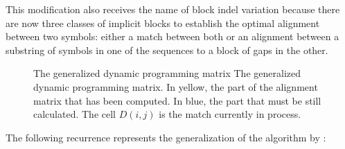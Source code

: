 This modification also receives the name of block indel variation because there are now three classes of 
implicit blocks to establish the optimal alignment between two symbols: either a match between both or an 
alignment between a substring of symbols in one of the sequences to a block of gaps in the other.

\clearpage
\begin{figure}[t!]
\begin{center}
\setlength{\fboxsep}{0pt}
          {The generalized dynamic programming matrix}%
          {The generalized dynamic programming matrix.}%
          {In yellow, the part of the alignment matrix that has been computed. In blue, the part that must be still calculated. The cell $D(i,j)$ is the match currently in process.}
\end{center}
\end{figure}

The following recurrence represents the generalization of the 
\citeauthor{sellers:1974a} algorithm by :

\begin{center}
\end{center}

